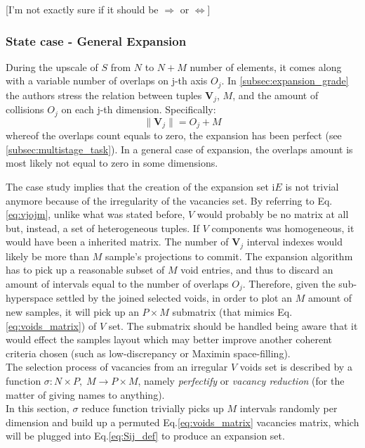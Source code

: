\documentclass[12pt]{extarticle}
\newcommand{\meqref}[1]{Eq.\ref{#1}}
\begin{document}
[I'm not exactly sure if it should be $\Rightarrow$ or $\Leftrightarrow$]

\subsubsection{State case - General Expansion}
\label{subsubsec:general_expansion_case}
During the upscale of $S$ from $N$ to $N+M$ number of elements, it comes along with a variable number of overlaps on j-th axis $O_j$.
In \cref{subsec:expansion_grade} the authors stress the relation between tuples $\textbf{V}_j$, $M$, and the amount of collisions $O_j$ on each j-th dimension. Specifically:
\begin{equation}
\label{eq:vjojm}	%
\parallel \textbf{V}_j \parallel = O_j + M
\end{equation}
whereof the overlaps count equals to zero, the expansion has been perfect (see \cref{subsec:multistage_task}). In a general case of expansion, the overlaps amount is most likely not equal to zero in some dimensions.

The case study implies that the creation of the expansion set i$E$ is not trivial anymore because of the irregularity of the vacancies set. By referring to \meqref{eq:vjojm}, unlike what was stated before, $V$ would probably be no matrix at all but, instead, a set of heterogeneous tuples. If $V$ components was homogeneous, it would have been a inherited matrix. The number of $\textbf{V}_j$ interval indexes would likely be more than $M$ sample's projections to commit. The expansion algorithm has to pick up a reasonable subset of $M$ void entries, and thus to discard an amount of intervals equal to the number of overlaps $O_j$. Therefore, given the sub-hyperspace settled by the joined selected voids, in order to plot an $M$ amount of new samples, it will pick up an $P \times M$ submatrix (that mimics \meqref{eq:voids_matrix}) of $V$ set. The submatrix should be handled being aware that it would effect the samples layout which may better improve another coherent criteria chosen (such as low-discrepancy or Maximin space-filling).\\
The selection process of vacancies from an irregular $V$ voids set is described by a function $\sigma: N \times P, \; M \rightarrow P \times M$, namely \textit{perfectify} or \textit{vacancy reduction} (for the matter of giving names to anything). \\ 
In this section, $\sigma$ reduce function trivially picks up $M$ intervals randomly per dimension and build up a permuted \meqref{eq:voids_matrix} vacancies matrix, which will be plugged into \meqref{eq:Sij_def} to produce an expansion set. 
\end{document}
